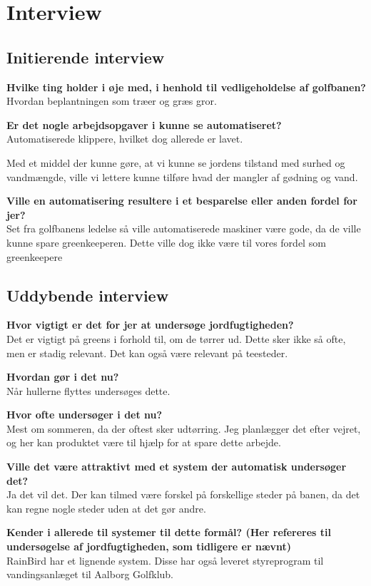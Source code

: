\chapter{Interview} \label{cha:interviewKim}
\section*{Initierende interview}
\textbf{Hvilke ting holder i øje med, i henhold til vedligeholdelse af golfbanen?}\\
Hvordan beplantningen som træer og græs gror.

\textbf{Er det nogle arbejdsopgaver i kunne se automatiseret?}\\
Automatiserede klippere, hvilket dog allerede er lavet.

Med et middel der kunne gøre, at vi kunne se jordens tilstand med surhed og vandmængde, ville vi lettere kunne tilføre hvad der mangler af gødning og vand.

\textbf{Ville en automatisering resultere i et besparelse eller anden fordel for jer?}\\
Set fra golfbanens ledelse så ville automatiserede maskiner være gode, da de ville kunne spare greenkeeperen.
Dette ville dog ikke være til vores fordel som greenkeepere

\section*{Uddybende interview}

\textbf{Hvor vigtigt er det for jer at undersøge jordfugtigheden?}\\
Det er vigtigt på greens i forhold til, om de tørrer ud. Dette sker ikke så ofte, men er stadig relevant.
Det kan også være relevant på teesteder.

\textbf{Hvordan gør i det nu?}\\
Når hullerne flyttes undersøges dette.

\textbf{Hvor ofte undersøger i det nu?}\\
Mest om sommeren, da der oftest sker udtørring. Jeg planlægger det efter vejret, og her kan produktet være til hjælp for at spare dette arbejde.

\textbf{Ville det være attraktivt med et system der automatisk undersøger det?}\\
Ja det vil det. Der kan tilmed være forskel på forskellige steder på banen, da det kan regne nogle steder uden at det gør andre.

\textbf{Kender i allerede til systemer til dette formål? (Her refereres til undersøgelse af jordfugtigheden, som tidligere er nævnt)}\\
RainBird har et lignende system. Disse har også leveret styreprogram til vandingsanlæget til Aalborg Golfklub.

